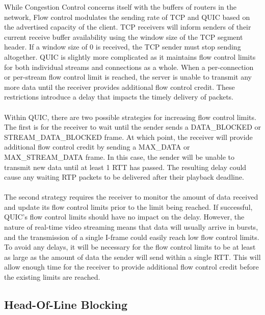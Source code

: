 \documentclass{mpaper}
\begin{document}
\noindent While Congestion Control concerns itself with the buffers of routers in the network, Flow control modulates the sending rate of TCP and QUIC based on the advertised capacity of the client. TCP receivers will inform senders of their current receive buffer availability using the window size of the TCP segment header. If a window size of 0 is received, the TCP sender must stop sending altogether. QUIC is slightly more complicated as it maintains flow control limits for both individual streams and connections as a whole. When a per-connection or per-stream flow control limit is reached, the server is unable to transmit any more data until the receiver provides additional flow control credit. These restrictions introduce a delay that impacts the timely delivery of packets.
\\\\
Within QUIC, there are two possible strategies for increasing flow control limits. The first is for the receiver to wait until the sender sends a DATA\_BLOCKED or \newline STREAM\_DATA\_BLOCKED frame. At which point, the receiver will provide additional flow control credit by sending a MAX\_DATA or MAX\_STREAM\_DATA frame. In this case, the sender will be unable to transmit new data until at least 1 RTT has passed. The resulting delay could cause any waiting RTP packets to be delivered after their playback deadline.
\\\\
The second strategy requires the receiver to monitor the amount of data received and update its flow control limits prior to the limit being reached. If successful, QUIC's flow control limits should have no impact on the delay. However, the nature of real-time video streaming means that data will usually arrive in bursts, and the transmission of a single I-frame could easily reach low flow control limits. To avoid any delays, it will be necessary for the flow control limits to be at least as large as the amount of data the sender will send within a single RTT. This will allow enough time for the receiver to provide additional flow control credit before the existing limits are reached.


\subsection{Head-Of-Line Blocking} \label{Head-Of-Line Blocking}
\end{document}
